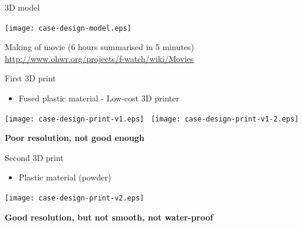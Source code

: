 \documentclass[compress,red]{beamer}
\begin{document}
\begin{frame}{3D model}

  \begin{center}
    \texttt{[image: case-design-model.eps]}
  \end{center}

  Making of movie (6 hours summarised in 5 minutes)
  \url{http://www.ohwr.org/projects/f-watch/wiki/Movies}


\end{frame}

\begin{frame}{First 3D print}

  \begin{itemize}
  \item Fused plastic material - Low-cost 3D printer
  \end{itemize}

  \begin{center}
    \texttt{[image: case-design-print-v1.eps]}~
    \texttt{[image: case-design-print-v1-2.eps]}
  \end{center}

  \textbf{Poor resolution, not good enough}


\end{frame}

\begin{frame}{Second 3D print}

  \begin{itemize}
  \item Plastic material (powder)
  \end{itemize}

  \begin{center}
    \texttt{[image: case-design-print-v2.eps]}
  \end{center}

  \textbf{Good resolution, but not smooth, not water-proof}


\end{frame}
\end{document}
